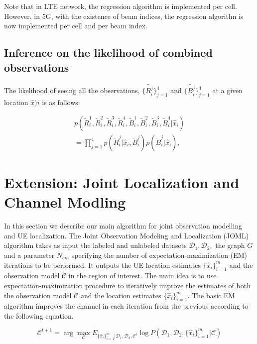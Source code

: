 \documentclass[conference, 10pt]{IEEEtran}
\begin{document}
Note that in LTE network, the regression algorithm is implemented per cell. However, in 5G, with the existence of
beam indices, the regression algorithn is now implemented per cell and per beam index.


\subsection{Inference on the likelihood of combined observations}
\label{sec:prob-combined}
The likelihood of seeing all the observations, $\{\tilde{R^j_i}\}_{j=1}^4$ and $\{\tilde{B^j_i}\}_{j=1}^4$ at a given location $\hat{x}){i}$ is as follows:

\begin{equation} 
\begin{split}
	p(\tilde{R}^1_i, \tilde{R}^2_i, \tilde{R}^3_i,\tilde{R}^4_i, \tilde{B}^1_i, \tilde{B}^2_i, \tilde{B}^3_i, \tilde{B}^4_i|\hat{x}_{i})
	\\
	=\prod_{j=1}^4 p(\tilde{R}^j_i|\hat{x}_{i}, \tilde{B}^j_i)p(\tilde{B}^j_i|\hat{x}_{i}),
\end{split}
\label{eqn:combined}
\end{equation}


\section{Extension: Joint Localization and Channel Modling}
\label{sec:extensionalgo}
In this section we describe our main algorithm for joint observation modelling and UE
localization. The Joint Observation Modeling and Localization (JOML) algorithm takes
as input the labeled and unlabeled datasets $\mathcal{D}_1,\mathcal{D}_2,$ the
graph $G$ and a parameter $N_{em}$ specifying the number of
expectation-maximization (EM) iterations to be performed. It outputs the UE
location estimates $\{\hat{x}_i\}_{i=1}^m$ and the observation model $\mathcal{C}$
in the region of interest. The main idea is to use expectation-maximization
procedure to iteratively improve the estimates of both the observation model
$\mathcal{C}$ and the location estimates $\{\hat{x}_i\}_{i=1}^m.$ The basic EM
algorithm improves the channel in each iteration from the previous according to
the following equation.

\begin{equation}
\mathcal{C}^{t+1} = \arg \max_{\mathcal{C}} E_{\{\hat{x}_i\}_{i=1}^m |\mathcal{D}_1,\mathcal{D}_2,\mathcal{C}^t} \log  P(\mathcal{D}_1,\mathcal{D}_2,\{\hat{x}_i\}_{i=1}^m|\mathcal{C}) \label{eq:EM}
\end{equation}
\end{document}
